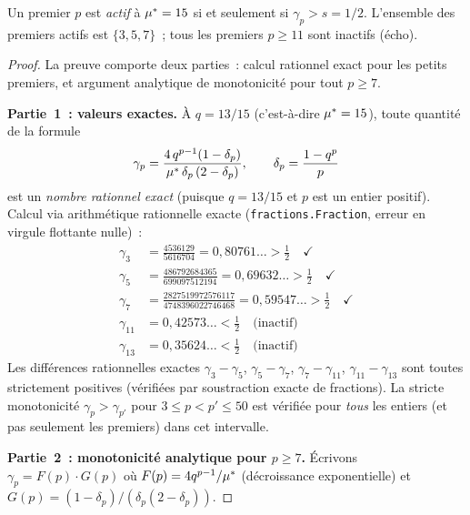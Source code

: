 \documentclass[12pt,a4paper]{article}
\begin{document}
\mTHM
\begin{theoreme}
\label{thm:active}
Un premier $p$ est \emph{actif} à ${\mu^{*}} = 15$ si et seulement si
$\gamma_p > s = 1/2$. L'ensemble des premiers actifs est
$\{3, 5, 7\}$~; tous les premiers $p \geq 11$ sont inactifs (écho).

\begin{proof}
La preuve comporte deux parties~: calcul rationnel exact pour les
petits premiers, et argument analytique de monotonicité pour tout
$p \geq 7$.

\medskip\noindent\textbf{Partie~1~: valeurs exactes.}
À $q = 13/15$ (c'est-à-dire ${\mu^{*}} = 15$), toute quantité de la
formule
\begin{equation}
  \gamma_p = \frac{4\,q^{p-1}(1 - \delta_p)}{{\mu^{*}}\,\delta_p\,(2 - \delta_p)},
  \qquad \delta_p = \frac{1 - q^p}{p}
  \label{eq:gamma_explicit}
\end{equation}
est un \emph{nombre rationnel exact} (puisque $q = 13/15$ et $p$ est
un entier positif). Calcul via arithmétique rationnelle exacte
(\texttt{fractions.Fraction}, erreur en virgule flottante nulle)~:
\begin{align*}
\gamma_3 &= \tfrac{4536129}{5616704} = 0{,}80761\ldots > \tfrac{1}{2} \quad \checkmark \\
\gamma_5 &= \tfrac{486792684365}{699097512194} = 0{,}69632\ldots > \tfrac{1}{2} \quad \checkmark \\
\gamma_7 &= \tfrac{2827519972576117}{4748396022746468} = 0{,}59547\ldots > \tfrac{1}{2} \quad \checkmark \\[3pt]
\gamma_{11} &= 0{,}42573\ldots < \tfrac{1}{2} \quad \text{(inactif)} \\
\gamma_{13} &= 0{,}35624\ldots < \tfrac{1}{2} \quad \text{(inactif)}
\end{align*}
Les différences rationnelles exactes
$\gamma_3 - \gamma_5$, $\gamma_5 - \gamma_7$,
$\gamma_7 - \gamma_{11}$, $\gamma_{11} - \gamma_{13}$ sont toutes
strictement positives (vérifiées par soustraction exacte de
fractions). La stricte monotonicité $\gamma_p > \gamma_{p'}$ pour
$3 \leq p < p' \leq 50$ est vérifiée pour \emph{tous} les entiers
(et pas seulement les premiers) dans cet intervalle.

\medskip\noindent\textbf{Partie~2~: monotonicité analytique pour $p \geq 7$.}
Écrivons $\gamma_p = F(p) \cdot G(p)$ où
$F(p) = 4q^{p-1}/{\mu^{*}}$ (décroissance exponentielle) et
$G(p) = (1 - \delta_p)/(\delta_p(2-\delta_p))$.


\end{proof}
\end{theoreme}
\end{document}
